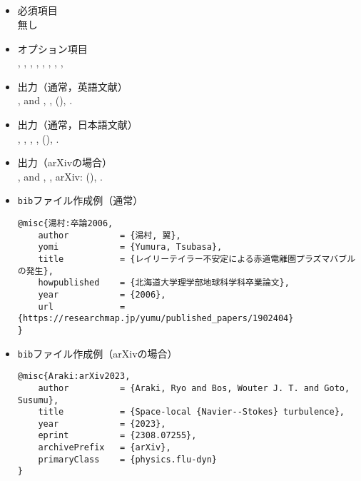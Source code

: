\documentclass[a4paper,fleqn,uplatex,dvipdfmx]{jsarticle}
\begin{document}
\subsection{\ttmisc}
\label{ssec:misc}
\begin{screen}
    \begin{itemize}
        \item 必須項目 \\
        無し
        \item オプション項目 \\
        \ttauthor, \tttitle, \tthowpublished, \ttarchivePrefix, \tteprint, \ttmonth, \ttyear, \ttnote, \ttkey
        \item 出力（通常，英語文献） \\
            \colorbox[gray]{0.8}{\ttauthorf}, \colorbox[gray]{0.8}{\ttauthors} and \colorbox[gray]{0.8}{\ttauthort}, \colorbox[gray]{0.8}{\tttitle}, \colorbox[gray]{0.8}{\tthowpublished} (\colorbox[gray]{0.8}{\ttyear}), \colorbox[gray]{0.8}{\ttnote}.
        \item 出力（通常，日本語文献） \\
            \colorbox[gray]{0.8}{\ttauthorf}, \colorbox[gray]{0.8}{\ttauthors}, \colorbox[gray]{0.8}{\ttauthort}, \colorbox[gray]{0.8}{\tttitle}, \colorbox[gray]{0.8}{\tthowpublished} (\colorbox[gray]{0.8}{\ttyear}), \colorbox[gray]{0.8}{\ttnote}.
        \item 出力（arXivの場合） \\
            \colorbox[gray]{0.8}{\ttauthorf}, \colorbox[gray]{0.8}{\ttauthors} and \colorbox[gray]{0.8}{\ttauthort}, \colorbox[gray]{0.8}{\tttitle}, arXiv: \colorbox[gray]{0.8}{\tteprint} (\colorbox[gray]{0.8}{\ttyear}), \colorbox[gray]{0.8}{\ttnote}.
        \item \verb|bib|ファイル作成例（通常） \vspace{-3mm}
\begin{verbatim}
@misc{湯村:卒論2006,
    author          = {湯村, 翼},
    yomi            = {Yumura, Tsubasa},
    title           = {レイリーテイラー不安定による赤道電離圏プラズマバブルの発生},
    howpublished    = {北海道大学理学部地球科学科卒業論文},
    year            = {2006},
    url             = {https://researchmap.jp/yumu/published_papers/1902404}
}
\end{verbatim}
        \item \verb|bib|ファイル作成例（arXivの場合） \vspace{-3mm}
\begin{verbatim}
@misc{Araki:arXiv2023,
    author          = {Araki, Ryo and Bos, Wouter J. T. and Goto, Susumu},
    title           = {Space-local {Navier--Stokes} turbulence}, 
    year            = {2023},
    eprint          = {2308.07255},
    archivePrefix   = {arXiv},
    primaryClass    = {physics.flu-dyn}
}
\end{verbatim}
    \end{itemize}
\end{screen}
\end{document}

